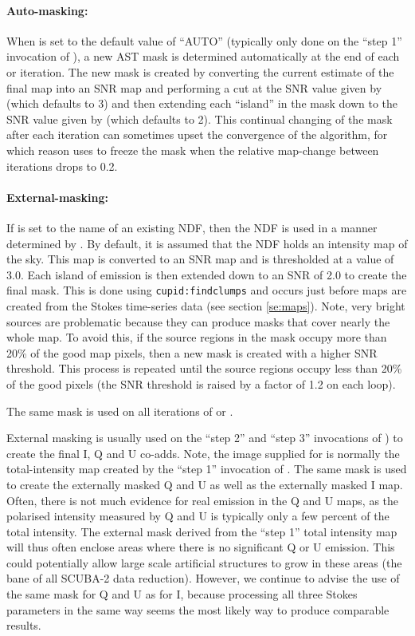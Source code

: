 \documentclass[twoside,11pt]{starlink}
\begin{document}
\paragraph{Auto-masking:}
When  is set to the default value of ``AUTO'' (typically only done
on the ``step 1'' invocation of \ptmap), a new AST mask is determined
automatically at the end of each \mmap or \sloop iteration. The new mask
is created by converting the current estimate of the final map into an SNR
map and performing a cut at the SNR value given by  (which
defaults to 3) and then extending each ``island'' in the mask down to the
SNR value given by  (which defaults to 2). This continual
changing of the mask after each iteration can sometimes upset the convergence
of the algorithm, for which reason \ptmap uses  to freeze
the mask when the relative map-change between iterations drops to 0.2.

\paragraph{External-masking:}
If  is set to the name of an existing NDF, then the NDF is used in a
manner determined by . By default, it is assumed that the NDF
holds an intensity map of the sky. This map is converted to an SNR map and is
thresholded at a  value of 3.0. Each island of emission is then extended down
to an SNR of 2.0 to create the final mask. This is done using
\texttt{cupid:findclumps} and occurs just before maps are created from the
Stokes time-series data (see section \ref{se:maps}). Note, very bright
sources are problematic because they can produce masks that cover nearly
the whole map. To avoid this, if the source regions in the mask occupy
more than 20\% of the good map pixels, then a new mask is created with a
higher SNR threshold. This process is repeated until the source regions
occupy less than 20\% of the good pixels (the SNR threshold is raised by
a factor of 1.2 on each loop).

The same mask is used on all iterations of \mmap or \sloop.

External masking is usually used on the ``step 2'' and ``step 3''
invocations  of \ptmap) to create the final I, Q and U co-adds. Note, the
image supplied for  is normally the total-intensity map created
by the ``step 1'' invocation of \ptmap. The same mask is used to create
the externally masked Q and U as well as the externally masked I map.
Often, there is not much evidence for real emission in the Q and U maps,
as the polarised intensity measured by Q and U is typically only a few
percent of the total intensity. The external mask derived from the ``step
1'' total intensity map will thus often enclose areas where there is no
significant Q or U emission. This could potentially allow large scale
artificial structures to grow in these areas (the bane of all SCUBA-2 data
reduction). However, we continue to advise the use of the same mask for Q
and U as for I, because processing all three Stokes parameters in the
same way seems the most likely way to produce comparable results.
\end{document}
